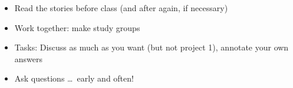 \documentclass[a4paper,landscape,headrule,footrule,xetex,25pt]{foils}
\begin{document}

\begin{itemize}
\item Read the stories before class (and after again, if necessary)
\item Work together: make study groups
\item Tasks: Discuss as much as you want (but not project 1), annotate your own answers
\item Ask questions \ldots\ early and often!
\end{itemize}



\end{document}
